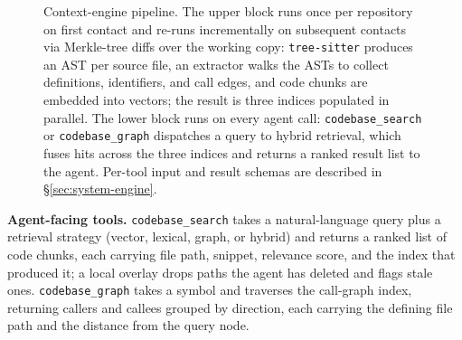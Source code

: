 \begin{figure}[!tbp]
{%
  }%
  \caption{Context-engine pipeline. The upper block runs once per repository on
    first contact and re-runs incrementally on subsequent contacts via
    Merkle-tree diffs over the working copy: \texttt{tree-sitter} produces an
    AST per source file, an extractor walks the ASTs to collect definitions,
    identifiers, and call edges, and code chunks are embedded into vectors;
    the result is three indices populated in parallel. The lower block runs on
    every agent call:
    \texttt{codebase\_search} or \texttt{codebase\_graph} dispatches a query to
    hybrid retrieval, which fuses hits across the three indices and returns a
    ranked result list to the agent. Per-tool input and result schemas are
    described in \S\ref{sec:system-engine}.}
  \label{fig:engine-pipeline}
\end{figure}

\textbf{Agent-facing tools.} \texttt{codebase\_search} takes a natural-language query plus a retrieval strategy (vector, lexical, graph, or hybrid) and returns a ranked list of code chunks, each carrying file path, snippet, relevance score, and the index that produced it; a local overlay drops paths the agent has deleted and flags stale ones. \texttt{codebase\_graph} takes a symbol and traverses the call-graph index, returning callers and callees grouped by direction, each carrying the defining file path and the distance from the query node.

